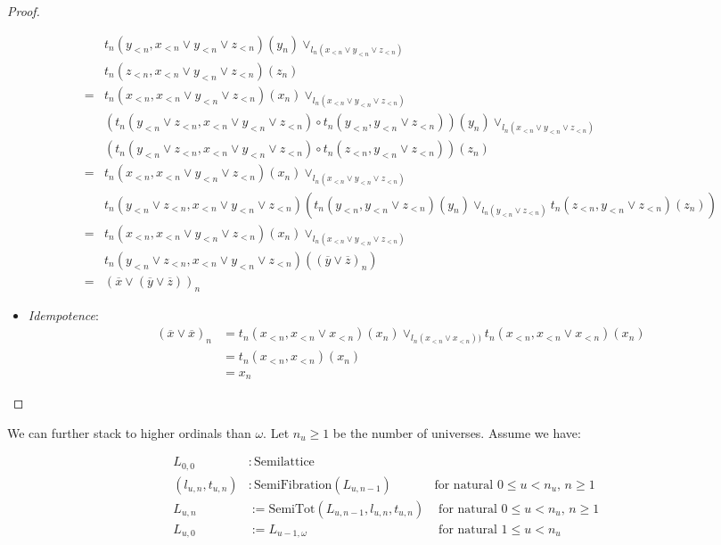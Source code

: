 \documentclass{article}
\begin{document}
\begin{proof}
\begin{itemize}
\begin{align*}
               & t_n(y_{<n}, x_{<n} \vee y_{<n} \vee z_{<n})(y_n) \vee_{l_n(x_{<n} \vee y_{<n} \vee z_{<n})} \\
               & t_n(z_{<n}, x_{<n} \vee y_{<n} \vee z_{<n})(z_n)  \\
              =& t_n(x_{<n}, x_{<n} \vee y_{<n} \vee z_{<n})(x_n) \vee_{l_n(x_{<n} \vee y_{<n} \vee z_{<n})} \\
               & (t_n(y_{<n} \vee z_{<n}, x_{<n} \vee y_{<n} \vee z_{<n}) \circ t_n(y_{<n}, y_{<n} \vee z_{<n}))(y_n) \vee_{l_n(x_{<n} \vee y_{<n} \vee z_{<n})} \\
               & (t_n(y_{<n} \vee z_{<n}, x_{<n} \vee y_{<n} \vee z_{<n}) \circ t_n(z_{<n}, y_{<n} \vee z_{<n}))(z_n)  \\
              =& t_n(x_{<n}, x_{<n} \vee y_{<n} \vee z_{<n})(x_n) \vee_{l_n(x_{<n} \vee y_{<n} \vee z_{<n})} \\
               & t_n(y_{<n} \vee z_{<n}, x_{<n} \vee y_{<n} \vee z_{<n})(
                          t_n(y_{<n}, y_{<n} \vee z_{<n})(y_n) \vee_{l_n(y_{<n} \vee z_{<n})}
                          t_n(z_{<n}, y_{<n} \vee z_{<n})(z_n)) \\
              =& t_n(x_{<n}, x_{<n} \vee y_{<n} \vee z_{<n})(x_n) \vee_{l_n(x_{<n} \vee y_{<n} \vee z_{<n})} \\
               & t_n(y_{<n} \vee z_{<n}, x_{<n} \vee y_{<n} \vee z_{<n})((\overline{y} \vee \overline{z})_n) \\
              =& (\overline{x} \vee (\overline{y} \vee \overline{z}))_n
            \end{align*}
          \item \emph{Idempotence}:
            \begin{align*}
              (\overline{x} \vee \overline{x})_n &= t_n(x_{<n}, x_{<n} \vee x_{<n})(x_n) \vee_{l_n(x_{<n} \vee x_{<n}))} t_n(x_{<n}, x_{<n} \vee x_{<n})(x_n) \\
              &= t_n(x_{<n}, x_{<n})(x_n) \\
              &= x_n
            \end{align*}
        \end{itemize}
      \end{proof}

      We can further stack to higher ordinals than $\omega$. Let $n_u \geq 1$ be the number of universes. Assume we have:

      \begin{align*}
        L_{0, 0} &: \mathrm{Semilattice} & \\
        (l_{u, n}, t_{u, n}) &: \mathrm{SemiFibration}(L_{u, n-1}) & \text{for natural $0 \leq u < n_u$, $n \geq 1$ } \\
        L_{u, n} &:= \mathrm{SemiTot}(L_{u, n-1}, l_{u, n}, t_{u, n})    & \text{ for natural $0 \leq u < n_u$, $n \geq 1$ } \\
        L_{u, 0} &:= L_{u-1, \omega} & \text{ for natural $1 \leq u < n_u$ }
      \end{align*}
\end{document}
